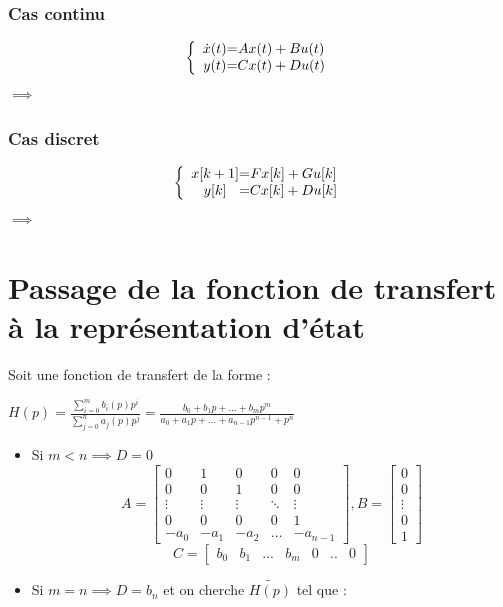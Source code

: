\subsubsection{Cas continu}
\LARGE{
    \[
\left \{
\begin{array}{c @{=} c}
    \dot x(t) & Ax(t) + Bu(t)\\
    y(t) & Cx(t) + Du(t)
\end{array}
\right.
\]
$\implies$ \Large{}
\subsubsection{Cas discret}
\LARGE{
    \[
\left \{
\begin{array}{c @{=} c}
    x[k+1] & Fx[k] + Gu[k]\\
    y[k] & Cx[k] + Du[k]
\end{array}
\right.
\]
$\implies$ \Large{}
\section{Passage de la fonction de transfert à la représentation d'état}
Soit une fonction de transfert de la forme : \newline
\begin{center}
    \LARGE{$
    H(p) = \frac{\sum_{i=0}^{m} b_{i}(p)p^{i}}{\sum_{j=0}^{n} a_{j}(p)p^{j}} =
            \frac{b_{0} + b_{1}p + ... + b_{m}p^{m}}{a_{0} + a_{1}p + ... + a_{n-1}p^{n-1} + p^{n}}
    $}
\end{center}
\newpage
\begin{itemize}
    \item Si $m < n \implies D = 0$ \newline
        \[A =
        \begin{bmatrix}
            0 & 1 & 0 & 0 & 0 \\
            0 & 0 & 1 & 0  & 0 \\
            \vdots & \vdots & \vdots & \ddots & \vdots \\
            0 & 0 & 0 & 0 & 1 \\
            -a_{0} & -a_{1} & -a_{2} & \dots  & -a_{n-1}
        \end{bmatrix}
        ,B = 
        \begin{bmatrix}
            0 \\
            0 \\
            \vdots \\
            0 \\
            1
        \end{bmatrix}
        \]    
        \[C = 
        \begin{bmatrix}
            b_{0} & b_{1} & ... & b_{m} & 0 & .. & 0
        \end{bmatrix}
        \] \newline
    \item Si $m = n \implies D = b_{n}$
        et on cherche $\tilde{H(p)}$ tel que : \newline
        

\end{itemize}}}
